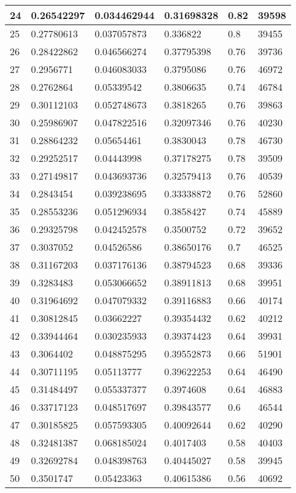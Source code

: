 \begin{longtable}{|l|l|l|l|l|l|}
24 & 0.26542297 & 0.034462944 & 0.31698328 & 0.82 & 39598 \\ \hline 
25 & 0.27780613 & 0.037057873 & 0.336822 & 0.8 & 39455 \\ \hline 
26 & 0.28422862 & 0.046566274 & 0.37795398 & 0.76 & 39736 \\ \hline 
27 & 0.2956771 & 0.046083033 & 0.3795086 & 0.76 & 46972 \\ \hline 
28 & 0.2762864 & 0.05339542 & 0.3806635 & 0.74 & 46784 \\ \hline 
29 & 0.30112103 & 0.052748673 & 0.3818265 & 0.76 & 39863 \\ \hline 
30 & 0.25986907 & 0.047822516 & 0.32097346 & 0.76 & 40230 \\ \hline 
31 & 0.28864232 & 0.05654461 & 0.3830043 & 0.78 & 46730 \\ \hline 
32 & 0.29252517 & 0.04443998 & 0.37178275 & 0.78 & 39509 \\ \hline 
33 & 0.27149817 & 0.043693736 & 0.32579413 & 0.76 & 40539 \\ \hline 
34 & 0.2843454 & 0.039238695 & 0.33338872 & 0.76 & 52860 \\ \hline 
35 & 0.28553236 & 0.051296934 & 0.3858427 & 0.74 & 45889 \\ \hline 
36 & 0.29325798 & 0.042452578 & 0.3500752 & 0.72 & 39652 \\ \hline 
37 & 0.3037052 & 0.04526586 & 0.38650176 & 0.7 & 46525 \\ \hline 
38 & 0.31167203 & 0.037176136 & 0.38794523 & 0.68 & 39336 \\ \hline 
39 & 0.3283483 & 0.053066652 & 0.38911813 & 0.68 & 39951 \\ \hline 
40 & 0.31964692 & 0.047079332 & 0.39116883 & 0.66 & 40174 \\ \hline 
41 & 0.30812845 & 0.03662227 & 0.39354432 & 0.62 & 40212 \\ \hline 
42 & 0.33944464 & 0.030235933 & 0.39374423 & 0.64 & 39931 \\ \hline 
43 & 0.3064402 & 0.048875295 & 0.39552873 & 0.66 & 51901 \\ \hline 
44 & 0.30711195 & 0.05113777 & 0.39622253 & 0.64 & 46490 \\ \hline 
45 & 0.31484497 & 0.055337377 & 0.3974608 & 0.64 & 46883 \\ \hline 
46 & 0.33717123 & 0.048517697 & 0.39843577 & 0.6 & 46544 \\ \hline 
47 & 0.30185825 & 0.057593305 & 0.40092644 & 0.62 & 40290 \\ \hline 
48 & 0.32481387 & 0.068185024 & 0.4017403 & 0.58 & 40403 \\ \hline 
49 & 0.32692784 & 0.048398763 & 0.40445027 & 0.58 & 39945 \\ \hline 
50 & 0.3501747 & 0.05423363 & 0.40615386 & 0.56 & 40692 \\ \hline 
\end{longtable}